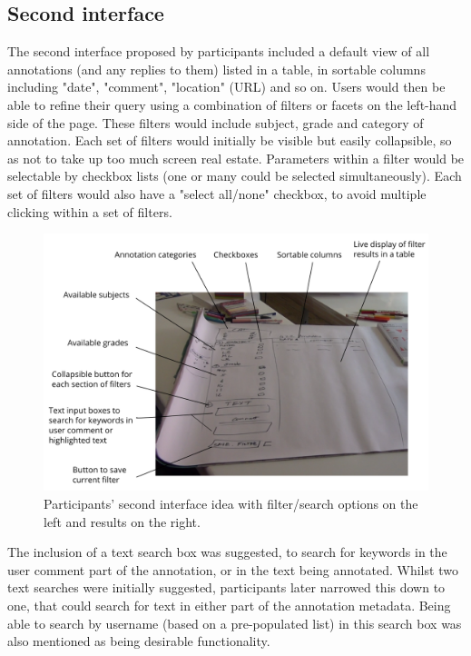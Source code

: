 \subsection{Second interface}
The second interface proposed by participants included a default view of all annotations (and any replies to them) listed in a table, in sortable columns including "date", "comment", "location" (URL) and so on. Users would then be able to refine their query using a combination of filters or facets on the left-hand side of the page. These filters would include subject, grade and category of annotation. Each set of filters would initially be visible but easily collapsible, so as not to take up too much screen real estate. Parameters within a filter would be selectable by checkbox lists (one or many could be selected simultaneously). Each set of filters would also have a "select all/none" checkbox, to avoid multiple clicking within a set of filters.
\begin{figure}[h!]
    \centering
    \includegraphics[width=\textwidth]{Figures/PD1shot4labels.png}
 \caption{Participants' second interface idea with filter/search options on the left and results on the right.}
\end{figure}

The inclusion of a text search box was suggested, to search for keywords in the user comment part of the annotation, or in the text being annotated. Whilst two text searches were initially suggested, participants later narrowed this down to one, that could search for text in either part of the annotation metadata. Being able to search by username (based on a pre-populated list) in this search box was also mentioned as being desirable functionality. 

